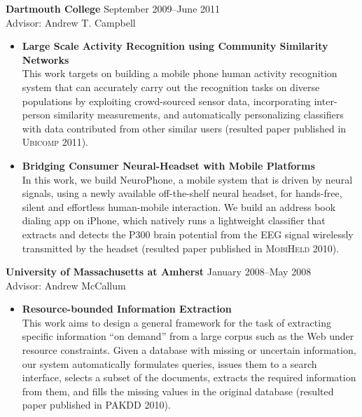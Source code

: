 {\bf Dartmouth College} \hfill September 2009--June 2011\\
Advisor: Andrew T. Campbell
\begin{itemize}
\item \textbf{Large Scale Activity Recognition using Community
  Similarity Networks} \\ This work targets on building a mobile phone
  human activity recognition system that can accurately carry out the
  recognition tasks on diverse populations by exploiting crowd-sourced
  sensor data, incorporating inter-person similarity measurements, and
  automatically personalizing classifiers with data contributed from
  other similar users (resulted paper published in \textsc{Ubicomp 2011}).

\item \textbf{Bridging Consumer Neural-Headset with Mobile Platforms}
  \\ In this work, we build NeuroPhone, a mobile system that is driven
  by neural signals, using a newly available off-the-shelf neural
  headset, for hands-free, silent and effortless human-mobile
  interaction. We build an address book dialing app on iPhone, which
  natively runs a lightweight classifier that extracts and detects the
  P300 brain potential from the EEG signal wirelessly transmitted by
  the headset (resulted paper published in \textsc{MobiHeld 2010}).
\end{itemize}

{\bf University of Massachusetts at Amherst} \hfill January 2008--May
2008 \\ Advisor: Andrew McCallum

\begin{itemize}
\item \textbf{Resource-bounded Information Extraction} \\ This work
  aims to design a general framework for the task of extracting
  specific information ``on demand'' from a large corpus such as the
  Web under resource constraints. Given a database with missing or
  uncertain information, our system automatically formulates queries,
  issues them to a search interface, selects a subset of the
  documents, extracts the required information from them, and fills
  the missing values in the original database (resulted paper
  published in \textsc{PAKDD 2010}).
\end{itemize}

